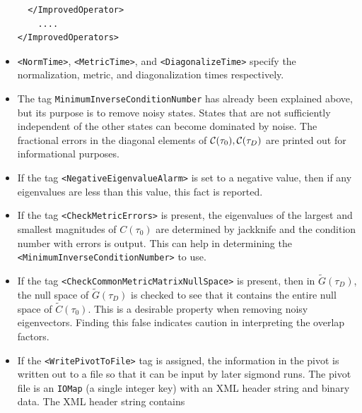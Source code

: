 \documentclass[12pt]{article}
\newcommand{\vb}{\texttt}
\begin{document}
\begin{itemize}
\begin{verbatim}
  </ImprovedOperator>                                                        
    ....                                                                      
</ImprovedOperators>                                                         
\end{verbatim}
\item 
\vb{<NormTime>}, \vb{<MetricTime>}, and \vb{<DiagonalizeTime>} specify the normalization,
  metric, and diagonalization times respectively.
\item                                                                         
The tag \vb{MinimumInverseConditionNumber} has already been explained above,     
but its purpose is to remove noisy states.  States that are not sufficiently  
independent of the other states can become dominated by noise.                
The fractional errors in the diagonal elements of ${\cal C}(\tau_0), {\cal C}(\tau_D)$ are  
printed out for informational purposes.                                       
\item                                      
If the tag \vb{<NegativeEigenvalueAlarm>} is set to a negative value, then         
if any eigenvalues are less than this value, this fact is reported.           
\item     
If the tag \vb{<CheckMetricErrors>} is present, the eigenvalues of the largest     
and smallest magnitudes of $C(\tau_0)$ are determined by jackknife and the        
condition number with errors is output.  This can help in determining         
the \vb{<MinimumInverseConditionNumber>} to use.                                   
\item                                     
If the tag \vb{<CheckCommonMetricMatrixNullSpace>} is present, then in             
$\tilde{G}(\tau_D)$, the null space of $\tilde{G}(\tau_D)$ is checked to see that           
it contains the entire null space of $\tilde{C}(\tau_0)$.  This is a desirable       
property when removing noisy eigenvectors.  Finding this false indicates      
caution in interpreting the overlap factors.                                  
\item                                                          
If the \vb{<WritePivotToFile>} tag is assigned, the information in the pivot       
is written out to a file so that it can be input by later sigmond runs.       
The pivot file is an \vb{IOMap} (a single integer key) with an XML header string   
and binary data. The XML header string contains
\begin{itemize}                               

\end{itemize}
\end{itemize}
\end{document}
